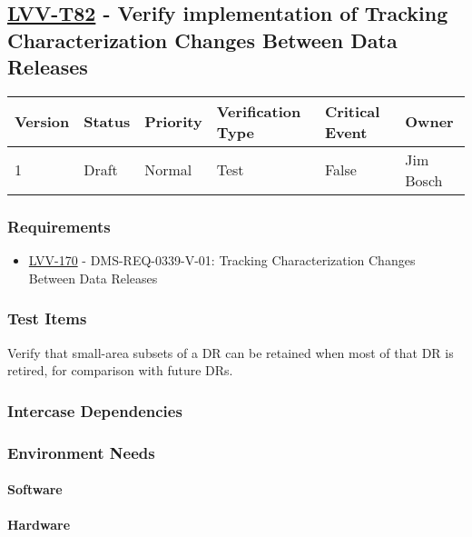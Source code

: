\subsection{\href{https://jira.lsstcorp.org/secure/Tests.jspa\#/testCase/LVV-T82}{LVV-T82}
    - Verify implementation of Tracking Characterization Changes Between Data Releases}\label{lvv-t82}

\begin{longtable}[]{llllll}
\toprule
Version & Status & Priority & Verification Type & Critical Event & Owner
\\\midrule
1 & Draft & Normal &
Test & False & Jim Bosch
\\\bottomrule
\end{longtable}

\subsubsection{Requirements}
\begin{itemize}
\item \href{https://jira.lsstcorp.org/browse/LVV-170}{LVV-170} - DMS-REQ-0339-V-01: Tracking Characterization Changes Between Data Releases
\end{itemize}

\subsubsection{Test Items}
Verify that small-area subsets of a DR can be retained when most of that
DR is retired, for comparison with future DRs.



\subsubsection{Intercase Dependencies}

\subsubsection{Environment Needs}

\paragraph{Software}

\paragraph{Hardware}

